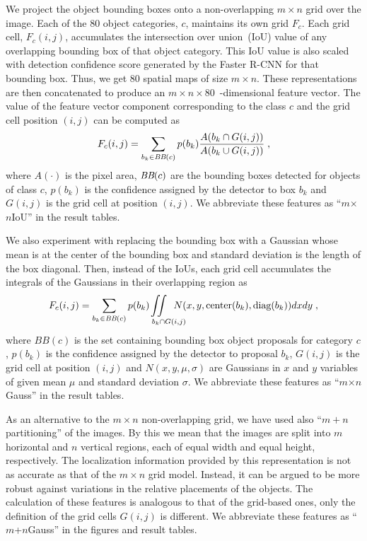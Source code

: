 We project the object bounding boxes onto a non-overlapping $m \times n$ grid
over the image.
Each of the 80 object categories, $c$, maintains its own grid $F_c$.
Each grid cell, $F_c(i,j)$, accumulates the intersection over union~(IoU) value
of any overlapping bounding box of that object category. 
This IoU value is also scaled with detection confidence score generated by the
Faster R-CNN for that bounding box.
Thus, we get 80 spatial maps of size $m\times n$. 
These representations are then concatenated to produce an $m\times
n\times80$~-dimensional feature vector.
The value of the feature vector component corresponding to the class $c$ and the
grid cell position $(i,j)$ can be computed as 
\begin{equation} 
\label{eqn:Iou} 
F_c(i,j) = \sum_{b_k \in \text{\it BB}(c)}p(b_k)\frac{ A(b_k \cap G(i,j))}{A(b_k \cup G(i,j))} \;, 
\end{equation}
where $A(\cdot)$ is the pixel area, $\text{\it BB}(c)$ are the bounding boxes
detected for objects of class $c$, $p(b_k)$ is the confidence assigned by the
detector to box $b_k$ and $G(i,j)$ is the grid cell at position $(i,j)$.
We abbreviate these features as ``$m$$\times${}$n$IoU'' in the result tables.

We also experiment with replacing the bounding box with a Gaussian whose mean is
at the center of the bounding box and standard deviation is the length of the
box diagonal.
Then, instead of the IoUs, each grid cell accumulates the integrals of the
Gaussians in their overlapping region as
\begin{equation} \label{eqn:Gauss} F_c(i,j) = \sum_{b_k \in \text{\it
        BB}(c)} p(b_k)\text{\hspace*{-7mm}}\iint\displaylimits_%
{\text{\hspace{9mm}}b_k \cap G(i,j)}\text{\hspace*{-5mm}}
N(x,y,\text{center}(b_k),\text{diag}(b_k)) dx dy \; , \end{equation}
\noindent where $BB(c)$ is the set containing bounding box object proposals for
category $c$, $p(b_k)$ is the confidence assigned by the detector to proposal
$b_k$, $G(i,j)$ is the grid cell at position $(i,j)$ and $N(x,y,\mu,\sigma)$ are
Gaussians in $x$ and $y$ variables of given mean $\mu$ and standard deviation $\sigma$.
We abbreviate these features as ``$m$$\times${}$n$Gauss'' in the result tables.

As an alternative to the $m\times n$ non-overlapping grid, we have used also
``$m+n$ partitioning'' of the images.
By this we mean that the images are split into $m$ horizontal and $n$ vertical
regions, each of equal width and equal height, respectively.
The localization information provided by this representation is not as accurate
as that of the $m\times n$ grid model.
Instead, it can be argued to be more robust against variations in the relative
placements of the objects.
The calculation of these features is analogous to that of the grid-based ones,
only the definition of the grid cells $G(i,j)$ is different.
We abbreviate these features as ``$m$+$n$Gauss'' in the figures and result
tables.


